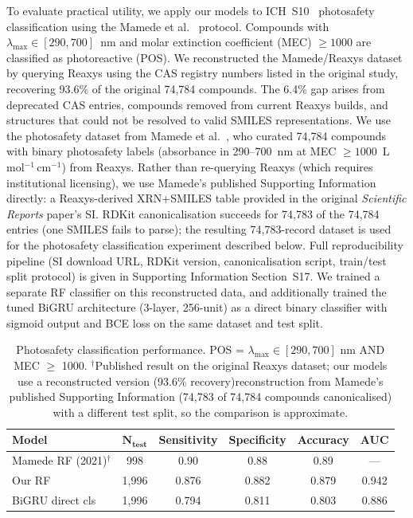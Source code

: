 \documentclass[journal=jcisd8,manuscript=article]{achemso}
\newcommand{\added}[1]{{\color{addedblue}#1}}
\newcommand{\removed}[1]{{\color{removedred}#1}}
\newcommand{\addedii}[1]{{\color{addedgreen}#1}}
\newcommand{\removedii}[1]{{\color{removedorange}#1}}
\begin{document}
To evaluate practical utility, we apply our models to ICH~S10~\cite{ICH2013S10} photosafety classification using the Mamede et al.~\cite{mamede2021machine} protocol.
Compounds with $\lambda_{\max} \in [290, 700]$~nm and molar extinction coefficient (MEC) $\geq 1000$ are classified as photoreactive (POS).
\removed{We reconstructed the Mamede/Reaxys dataset by querying Reaxys using the CAS registry numbers listed in the original study, recovering 93.6\% of the original 74,784 compounds.}
\removed{The 6.4\% gap arises from deprecated CAS entries, compounds removed from current Reaxys builds, and structures that could not be resolved to valid SMILES representations.}
\added{We use the photosafety dataset from Mamede et al.~\cite{mamede2021machine}, who curated 74{,}784 compounds with binary photosafety labels (absorbance in 290--700~nm at MEC $\geq 1000$~L\,mol$^{-1}$\,cm$^{-1}$) from Reaxys. Rather than re-querying Reaxys (which requires institutional licensing), we use Mamede's published Supporting Information directly: a Reaxys-derived XRN+SMILES table provided in the original \emph{Scientific Reports} paper's SI. RDKit canonicalisation succeeds for 74{,}783 of the 74{,}784 entries (one SMILES fails to parse); the resulting 74{,}783-record dataset is used for the photosafety classification experiment described below. Full reproducibility pipeline (SI download URL, RDKit version, canonicalisation script, train/test split protocol) is given in Supporting Information Section~S17.}
We trained a separate RF classifier on this reconstructed data, and additionally trained the tuned BiGRU architecture (3-layer, 256-unit) as a direct binary classifier with sigmoid output and BCE loss on the same dataset and test split.

\begin{table}[htbp]
\centering
\caption{Photosafety classification performance. POS = $\lambda_{\max} \in [290,700]$ nm AND MEC $\geq$ 1000. $^\dagger$Published result on \addedii{the }original Reaxys dataset; our models use a \removedii{reconstructed version (93.6\% recovery)}\addedii{reconstruction from Mamede's published Supporting Information (74{,}783 of 74{,}784 compounds canonicalised)} with a different test split, so \addedii{the }comparison is approximate.}
\label{tab:classification}
\begin{tabular}{lccccc}
\toprule
\textbf{Model} & $\boldsymbol{N_{\text{test}}}$ & \textbf{Sensitivity} & \textbf{Specificity} & \textbf{Accuracy} & \textbf{AUC} \\
\midrule
Mamede RF (2021)$^\dagger$ & 998 & 0.90 & 0.88 & 0.89 & --- \\
Our RF & 1,996 & 0.876 & 0.882 & 0.879 & 0.942 \\
BiGRU direct cls & 1,996 & 0.794 & 0.811 & 0.803 & 0.886 \\
\bottomrule
\end{tabular}
\end{table}
\end{document}
